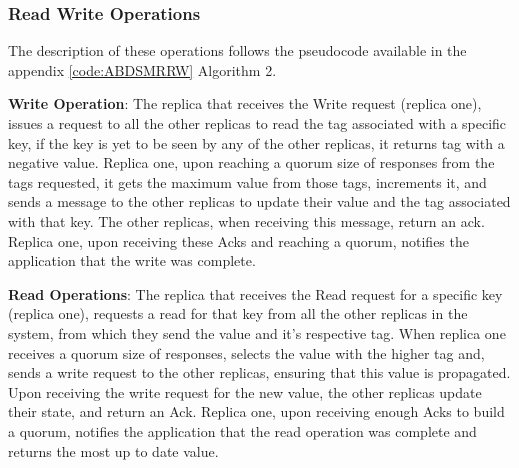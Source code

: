 \documentclass[10pt,a4paper,twocolumn]{article}
\begin{document}
\subsubsection{Read Write Operations}
\label{sec:abdrw}
The description of these operations follows the pseudocode available in the appendix \ref{code:ABDSMRRW} Algorithm 2.
\par \textbf{Write Operation}: The replica that receives the Write request (replica one), issues a request to all the other replicas to read the tag associated with a specific key, if the key is yet to be seen by any of the other replicas, it returns tag with a negative value. Replica one, upon reaching a quorum size of responses from the tags requested, it gets the maximum value from those tags, increments it, and sends a message to the other replicas to update their value and the tag associated with that key. The other replicas, when receiving this message, return an ack. Replica one, upon receiving these Acks and reaching a quorum, notifies the application that the write was complete.
\par \textbf{Read Operations}: The replica that receives the Read request for a specific key (replica one), requests a read for that key from all the other replicas in the system, from which they send the value and it's respective tag. When replica one receives a quorum size of responses, selects the value with the higher tag and, sends a write request to the other replicas, ensuring that this value is propagated. Upon receiving the write request for the new value, the other replicas update their state, and return an Ack. Replica one, upon receiving enough Acks to build a quorum, notifies the application that the read operation was complete and returns the most up to date value.
\end{document}
